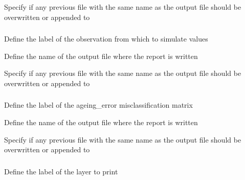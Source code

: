  {Specify if any previous file with the same name as the output file should be overwritten or appended to}

\subsubsection[Print an observation using simulated values]{}

 {Define the label of the observation from which to simulate values}

 {Define the name of the output file where the report is written}

 {Specify if any previous file with the same name as the output file should be overwritten or appended to}

\subsubsection[Print an ageing error misclassification matrix]{}

 {Define the label of the ageing\_error misclassification matrix}

 {Define the name of the output file where the report is written}

 {Specify if any previous file with the same name as the output file should be overwritten or appended to}

\subsubsection[Print a layer]{}

 {Define the label of the layer to print}

